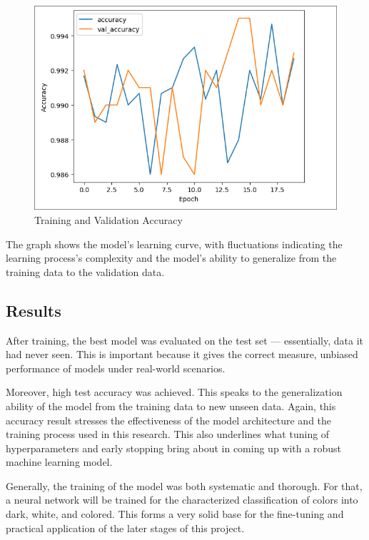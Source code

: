 \documentclass{article}
\begin{document}
\begin{figure}[H]
    \centering
    \includegraphics[width=\textwidth]{pictures/graph_1_training.png}
    \caption{Training and Validation Accuracy}
    \label{fig:accuracy_graph}
\end{figure}

The graph shows the model's learning curve, with fluctuations indicating the learning process's complexity and the model's ability to generalize from the training data to the validation data.

\subsection{Results}
After training, the best model was evaluated on the test set — essentially, data it had never seen. This is important because it gives the correct measure, unbiased performance of models under real-world scenarios.

Moreover, high test accuracy was achieved. This speaks to the generalization ability of the model from the training data to new unseen data. Again, this accuracy result stresses the effectiveness of the model architecture and the training process used in this research. This also underlines what tuning of hyperparameters and early stopping bring about in coming up with a robust machine learning model.

Generally, the training of the model was both systematic and thorough. For that, a neural network will be trained for the characterized classification of colors into dark, white, and colored. This forms a very solid base for the fine-tuning and practical application of the later stages of this project.\newpage
\end{document}
